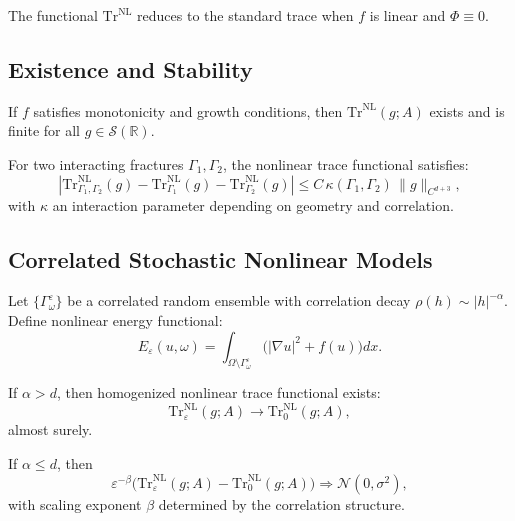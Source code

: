 \begin{remark}
The functional $\mathrm{Tr}^{\mathrm{NL}}$ reduces to the standard trace when $f$ is linear and $\Phi \equiv 0$.  
\end{remark}

\subsection{Existence and Stability}

\begin{theorem}
If $f$ satisfies monotonicity and growth conditions, then $\mathrm{Tr}^{\mathrm{NL}}(g;A)$ exists and is finite for all $g \in \mathcal{S}(\mathbb{R})$.  
\end{theorem}

\begin{theorem}
For two interacting fractures $\Gamma_1, \Gamma_2$, the nonlinear trace functional satisfies:
\[
|\mathrm{Tr}^{\mathrm{NL}}_{\Gamma_1,\Gamma_2}(g) - \mathrm{Tr}^{\mathrm{NL}}_{\Gamma_1}(g) - \mathrm{Tr}^{\mathrm{NL}}_{\Gamma_2}(g)| 
\leq C \, \kappa(\Gamma_1,\Gamma_2) \, \|g\|_{C^{d+3}},
\]
with $\kappa$ an interaction parameter depending on geometry and correlation.  
\end{theorem}

\subsection{Correlated Stochastic Nonlinear Models}

\begin{definition}
Let $\{\Gamma^\varepsilon_\omega\}$ be a correlated random ensemble with correlation decay $\rho(h)\sim |h|^{-\alpha}$.  
Define nonlinear energy functional:
\[
E_\varepsilon(u,\omega) = \int_{\Omega\setminus \Gamma^\varepsilon_\omega} \Big( |\nabla u|^2 + f(u) \Big) dx.
\]
\end{definition}

\begin{theorem}
If $\alpha>d$, then homogenized nonlinear trace functional exists:
\[
\mathrm{Tr}^{\mathrm{NL}}_\varepsilon(g;A) \to \mathrm{Tr}^{\mathrm{NL}}_0(g;A),
\]
almost surely.  
\end{theorem}

\begin{theorem}
If $\alpha \leq d$, then
\[
\varepsilon^{-\beta}\Big(\mathrm{Tr}^{\mathrm{NL}}_\varepsilon(g;A) - \mathrm{Tr}^{\mathrm{NL}}_0(g;A)\Big)
\Rightarrow \mathcal{N}(0,\sigma^2),
\]
with scaling exponent $\beta$ determined by the correlation structure.  
\end{theorem}

